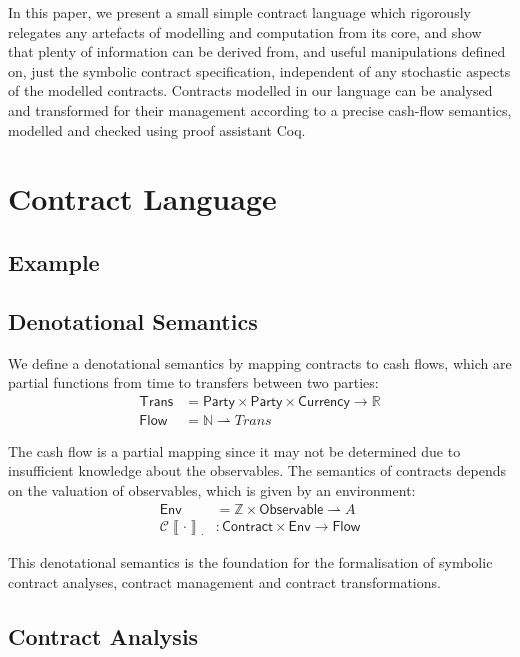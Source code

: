 \documentclass[a4paper,debug,twocolumn]{easychair}
\newcommand\type[1]{\mathsf{#1}}
\newcommand\reals{{\mathbb R}}
\newcommand\nats{{\mathbb N}}
\newcommand\ints{{\mathbb Z}}
\newcommand\pto{\rightharpoonup}
\newcommand\cSem[2]{{\mathcal C}\left\llbracket#1\right\rrbracket_{#2}}
\theoremstyle{plain}
\begin{document}
In this paper, we present a small simple contract language which rigorously
relegates any artefacts of modelling and computation from its core, and show
that plenty of information can be derived from, and useful manipulations defined
on, just the symbolic contract specification, independent of any stochastic
aspects of the modelled contracts.
Contracts modelled in our language can be analysed and transformed for their
management according to a precise cash-flow semantics, modelled and checked
using proof assistant Coq.

\section{Contract Language}
\label{sec:contract-language}

\subsection{Example}
\label{sec:example}

\subsection{Denotational Semantics}
\label{sec:semantics}

We define a denotational semantics by mapping contracts to cash flows,
which are partial functions from time to transfers between two
parties:
\begin{align*}
  \type{Trans} &= \type{Party} \times \type{Party} \times
  \type{Currency} \to \reals\\
  \type{Flow} &= \nats \pto Trans
\end{align*}

The cash flow is a partial mapping since it may not be determined due
to insufficient knowledge about the observables. The semantics of
contracts depends on the valuation of observables, which is given by
an environment:
\begin{align*}
  \type{Env} &= \ints \times \type{Observable} \pto A\\
  \cSem{\cdot}{\cdot}&\colon \type{Contract} \times \type{Env} \to
  \type{Flow}
\end{align*}

This denotational semantics is the foundation for the formalisation of
symbolic contract analyses, contract management and contract
transformations.


\subsection{Contract Analysis}
\label{sec:contract-analysis}
\end{document}
